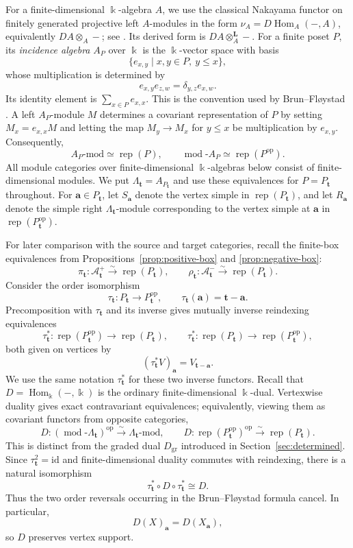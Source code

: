 \documentclass[12pt,reqno]{amsart}
\theoremstyle{definition}
\theoremstyle{remark}
\newcommand{\Rep}{\operatorname{rep}}
\newcommand{\Hom}{\operatorname{Hom}}
\newcommand{\modcat}{\operatorname{mod}}
\newcommand{\Dgr}{D_{\mathrm{gr}}}
\begin{document}
For a finite-dimensional $\Bbbk$-algebra $A$, we use the classical Nakayama
functor on finitely generated projective left $A$-modules in the form
$\nu_A=D\Hom_A(-,A)$, equivalently $DA\otimes_A-$; see \cite{ARS}.  Its
derived form is $DA\otimes_A^{\mathbf L}-$.  For a finite poset $P$, its
\emph{incidence algebra} $A_P$ over $\Bbbk$
is the $\Bbbk$-vector space with basis
\[
\{e_{x,y}\mid x,y\in P,\ y\le x\},
\]
whose multiplication is determined by
\[
e_{x,y}e_{z,w}=\delta_{y,z}e_{x,w}.
\]
Its identity element is $\sum_{x\in P}e_{x,x}$.  This is the convention
used by Brun--Fl\o ystad \cite{BF}.  A left $A_P$-module $M$ determines a
covariant representation of $P$ by setting $M_x=e_{x,x}M$ and letting the
map $M_y\to M_x$ for $y\le x$ be multiplication by $e_{x,y}$.
Consequently,
\[
A_P\text{-mod}\simeq\Rep(P),
\qquad
\modcat\text{-}A_P\simeq\Rep(P^{\mathrm{op}}).
\]
All module categories over finite-dimensional $\Bbbk$-algebras below
consist of finite-dimensional modules. We put
$\Lambda_{\mathbf t}=A_{P_{\mathbf t}}$ and use these equivalences for
$P=P_{\mathbf t}$ throughout.  For
$\mathbf a\in P_{\mathbf t}$, let $S_{\mathbf a}$ denote the vertex simple in
$\Rep(P_{\mathbf t})$, and let $R_{\mathbf a}$ denote the simple right
$\Lambda_{\mathbf t}$-module corresponding to the vertex simple at
$\mathbf a$ in $\Rep(P_{\mathbf t}^{\mathrm{op}})$.

For later comparison with the source and target categories, recall the
finite-box equivalences from Propositions~\ref{prop:positive-box} and
\ref{prop:negative-box}:
\[
\pi_{\mathbf t}:\mathcal A^+_{\mathbf t}\xrightarrow{\sim}\Rep(P_{\mathbf t}),
\qquad
\rho_{\mathbf t}:\mathcal A^-_{\mathbf t}\xrightarrow{\sim}\Rep(P_{\mathbf t}).
\]
Consider the order isomorphism
\[
\tau_{\mathbf t}:P_{\mathbf t}\longrightarrow P_{\mathbf t}^{\mathrm{op}},
\qquad
\tau_{\mathbf t}(\mathbf a)=\mathbf t-\mathbf a.
\]
Precomposition with $\tau_{\mathbf t}$ and its inverse gives mutually inverse
reindexing equivalences
\[
\tau_{\mathbf t}^*: \Rep(P_{\mathbf t}^{\mathrm{op}})
\longrightarrow \Rep(P_{\mathbf t}),
\qquad
\tau_{\mathbf t}^*: \Rep(P_{\mathbf t})
\longrightarrow \Rep(P_{\mathbf t}^{\mathrm{op}}),
\]
both given on vertices by
$$(\tau_{\mathbf t}^*V)_{\mathbf a}=V_{\mathbf t-\mathbf a}.$$
We use the same notation $\tau_{\mathbf t}^*$ for these two inverse functors.
Recall that
$D=\Hom_\Bbbk(-,\Bbbk)$ is the ordinary finite-dimensional $\Bbbk$-dual.  Vertexwise duality gives exact contravariant equivalences; equivalently,
viewing them as covariant functors from opposite categories,
\[
D:(\modcat\text{-}\Lambda_{\mathbf t})^{\mathrm{op}}
\xrightarrow{\sim}
\Lambda_{\mathbf t}\text{-mod},
\qquad
D:\Rep(P_{\mathbf t}^{\mathrm{op}})^{\mathrm{op}}
\xrightarrow{\sim}
\Rep(P_{\mathbf t}).
\]
This is distinct from the graded dual $\Dgr$ introduced in Section~\ref{sec:determined}.  Since $\tau_{\mathbf t}^2=\mathrm{id}$ and finite-dimensional duality commutes with reindexing, there is a natural isomorphism
\[
\tau_{\mathbf t}^*\circ D\circ\tau_{\mathbf t}^*\cong D.
\]
Thus the two order reversals occurring in the Brun--Fl\o ystad formula cancel.  In particular,
\[
D(X)_{\mathbf a}=D(X_{\mathbf a}),
\]
so $D$ preserves vertex support.
\end{document}
